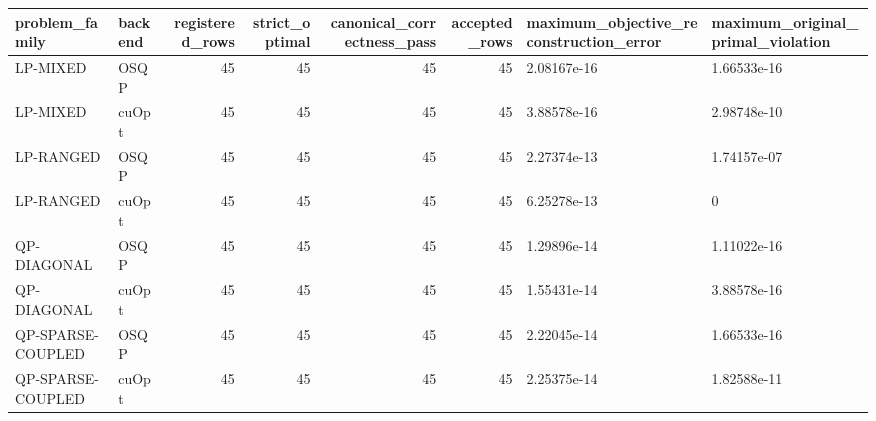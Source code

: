 \begin{table}
\label{tab:correctness-summary}
\begin{tabular}{llrrrrll}
\toprule
problem\_family & backend & registered\_rows & strict\_optimal & canonical\_correctness\_pass & accepted\_rows & maximum\_objective\_reconstruction\_error & maximum\_original\_primal\_violation \\
\midrule
LP-MIXED & OSQP & 45 & 45 & 45 & 45 & 2.08167e-16 & 1.66533e-16 \\
LP-MIXED & cuOpt & 45 & 45 & 45 & 45 & 3.88578e-16 & 2.98748e-10 \\
LP-RANGED & OSQP & 45 & 45 & 45 & 45 & 2.27374e-13 & 1.74157e-07 \\
LP-RANGED & cuOpt & 45 & 45 & 45 & 45 & 6.25278e-13 & 0 \\
QP-DIAGONAL & OSQP & 45 & 45 & 45 & 45 & 1.29896e-14 & 1.11022e-16 \\
QP-DIAGONAL & cuOpt & 45 & 45 & 45 & 45 & 1.55431e-14 & 3.88578e-16 \\
QP-SPARSE-COUPLED & OSQP & 45 & 45 & 45 & 45 & 2.22045e-14 & 1.66533e-16 \\
QP-SPARSE-COUPLED & cuOpt & 45 & 45 & 45 & 45 & 2.25375e-14 & 1.82588e-11 \\
\bottomrule
\end{tabular}
\end{table}
